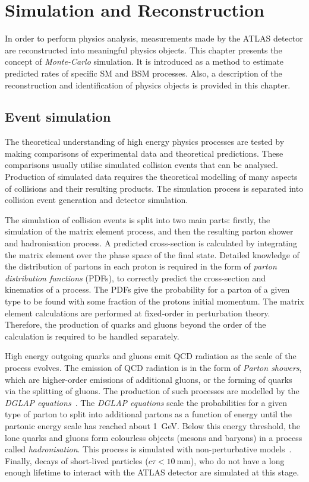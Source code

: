 \chapter{Simulation and Reconstruction}\label{chap:SimReco}
In order to perform physics analysis, measurements made by the ATLAS detector are reconstructed into meaningful physics objects. This chapter presents the concept of \emph{Monte-Carlo} simulation. It is introduced as a method to estimate predicted rates of specific SM and BSM processes. Also, a description of the reconstruction and identification of physics objects is provided in this chapter. 

\section{Event simulation}\label{sec:simulation}
The theoretical understanding of high energy physics processes are tested by making comparisons of experimental data and theoretical predictions. These comparisons usually utilise simulated collision events that can be analysed. Production of simulated data requires the theoretical modelling of many aspects of \protonproton collisions and their resulting products. The simulation process is separated into collision event generation and detector simulation.

The simulation of collision events is split into two main parts: firstly, the simulation of the matrix element process, and then the resulting parton shower and hadronisation process. A predicted cross-section is calculated by integrating the matrix element over the phase space of the final state. Detailed knowledge of the distribution of partons in each proton is required in the form of \emph{parton distribution functions} (PDFs), to correctly predict the cross-section and kinematics of a process. The PDFs give the probability for a parton of a given type to be found with some fraction of the protons initial momentum. The matrix element calculations are performed at fixed-order in perturbation theory. Therefore, the production of quarks and gluons beyond the order of the calculation is required to be handled separately. 

High energy outgoing quarks and gluons emit QCD radiation as the scale of the process evolves. The emission of QCD radiation is in the form of \emph{Parton showers}, which are higher-order emissions of additional gluons, or the forming of quarks via the splitting of gluons. The production of such processes are modelled by the \emph{DGLAP equations}~\cite{Dokshitzer77,Gribov72,Altarelli77}. The \emph{DGLAP equations} scale the probabilities for a given type of parton to split into additional partons as a function of energy until the partonic energy scale has reached about \SI{1}{\giga\electronvolt}. Below this energy threshold, the lone quarks and gluons form colourless objects (mesons and baryons) in a process called \emph{hadronisation}.  This process is simulated with non-perturbative models~\cite{Andersson1983,Webber1984}. Finally, decays of short-lived particles ($c\tau<\SI{10}{\milli\metre}$), who do not have a long enough lifetime to interact with the ATLAS detector are simulated at this stage. 

